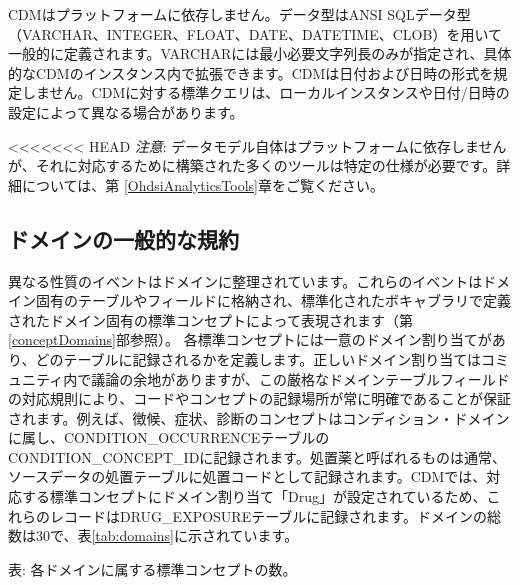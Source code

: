 \documentclass[
  11pt]{book}
\theoremstyle{definition}
\theoremstyle{definition}
\theoremstyle{definition}
\theoremstyle{definition}
\theoremstyle{remark}
\begin{document}
CDMはプラットフォームに依存しません。データ型はANSI SQLデータ型（VARCHAR、INTEGER、FLOAT、DATE、DATETIME、CLOB）を用いて一般的に定義されます。VARCHARには最小必要文字列長のみが指定され、具体的なCDMのインスタンス内で拡張できます。CDMは日付および日時の形式を規定しません。CDMに対する標準クエリは、ローカルインスタンスや日付/日時の設定によって異なる場合があります。

\textless\textless\textless\textless\textless\textless\textless{} HEAD
\emph{注意}: データモデル自体はプラットフォームに依存しませんが、それに対応するために構築された多くのツールは特定の仕様が必要です。詳細については、第 \ref{OhdsiAnalyticsTools}章をご覧ください。

\subsection{ドメインの一般的な規約}\label{domains}

異なる性質のイベントはドメインに整理されています。これらのイベントはドメイン固有のテーブルやフィールドに格納され、標準化されたボキャブラリで定義されたドメイン固有の標準コンセプトによって表現されます（第 \ref{conceptDomains}部参照）。 各標準コンセプトには一意のドメイン割り当てがあり、どのテーブルに記録されるかを定義します。正しいドメイン割り当てはコミュニティ内で議論の余地がありますが、この厳格なドメインテーブルフィールドの対応規則により、コードやコンセプトの記録場所が常に明確であることが保証されます。例えば、徴候、症状、診断のコンセプトはコンディション・ドメインに属し、CONDITION\_OCCURRENCEテーブルのCONDITION\_CONCEPT\_IDに記録されます。処置薬と呼ばれるものは通常、ソースデータの処置テーブルに処置コードとして記録されます。CDMでは、対応する標準コンセプトにドメイン割り当て「Drug」が設定されているため、これらのレコードはDRUG\_EXPOSUREテーブルに記録されます。ドメインの総数は30で、表\ref{tab:domains}に示されています。

表: \label{tab:domains} 各ドメインに属する標準コンセプトの数。
\end{document}
